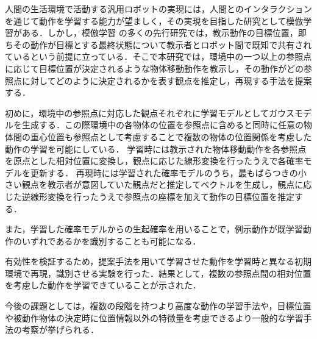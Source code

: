 ﻿人間の生活環境で活動する汎用ロボットの実現には，人間とのインタラクションを通じて動作を学習する能力が望ましく，その実現を目指した研究として模倣学習がある．しかし，模倣学習
の多くの先行研究では，教示動作の目標位置，即ちその動作が目標とする最終状態について教示者とロボット間で既知で共有されているという前提に立っている．そこで本研究では，環境中の一つ以上の参照点に応じて目標位置が決定されるような物体移動動作を教示し，その動作がどの参照点に対してどのように決定されるかを表す観点を推定し，再現する手法を提案する．

初めに，環境中の参照点に対応した観点それぞれに学習モデルとしてガウスモデルを生成する．この際環境中の各物体の位置を参照点に含めると同時に任意の物体間の重心位置も参照点として考慮することで複数の物体の位置関係を考慮した動作の学習を可能にしている．
学習時には教示された物体移動動作を各参照点を原点とした相対位置に変換し，観点に応じた線形変換を行ったうえで各確率モデルを更新する．
再現時には学習された確率モデルのうち，最もばらつきの小さい観点を教示者が意図していた観点だと推定してベクトルを生成し，観点に応じた逆線形変換を行ったうえで参照点の座標を加えて動作の目標位置を推定する．

また，学習した確率モデルからの生起確率を用いることで，例示動作が既学習動作のいずれであるかを識別することも可能になる．

有効性を検証するため，提案手法を用いて学習させた動作を学習時と異なる初期環境で再現，識別させる実験を行った．結果として，複数の参照点間の相対位置を考慮した動作を学習できていることが示された．

今後の課題としては，複数の段階を持つより高度な動作の学習手法や，目標位置や被動作物体の決定時に位置情報以外の特徴量を考慮できるより一般的な学習手法の考察が挙げられる．